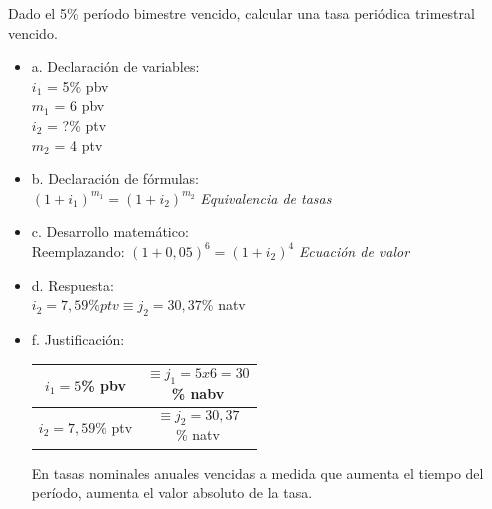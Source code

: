 Dado el 5\% período bimestre vencido, calcular una tasa periódica trimestral vencido.\\

\begin{itemize}
	\item a. Declaración de variables:\\
	
	$i_{1}$ = 5\% pbv\\
	$m_{1}$ = 6 pbv\\
	$i_{2}$ = ?\% ptv\\
	$m_{2}$ = 4 ptv\\
	
	\item b. Declaración de fórmulas:\\
	
	$(1+i_1)^{m_1} = (1+i_2)^{m_2}$ \hspace{35 pt} \textit{Equivalencia de tasas}\\
	
	\item c. Desarrollo matemático:\\
	
	Reemplazando: $(1+0,05)^{6} = (1+i_{2})^{4}$ \hspace{35 pt} \textit{Ecuación de valor}\\
	
	\item d. Respuesta:\\
	
	$i_{2} = 7,59\% ptv  \equiv j_{2} = 30,37$\% natv\\
	
	
	\item f. Justificación:\\
	
	\begin{table}[H]
\centering
\begin{tabular}{|c|c|}
\hline
$i_{1} = 5$\% pbv    & $$\equiv j_{1} =  5x6 = 30$$\% nabv\\ \hline
$i_{2} = 7,59$\% ptv & $$\equiv j_{2} = 30,37$$\% natv\\ \hline
\end{tabular}
\end{table}
	
	En tasas nominales anuales vencidas a medida que aumenta el tiempo del período, aumenta el valor absoluto de la tasa.\\
	
\end{itemize}

